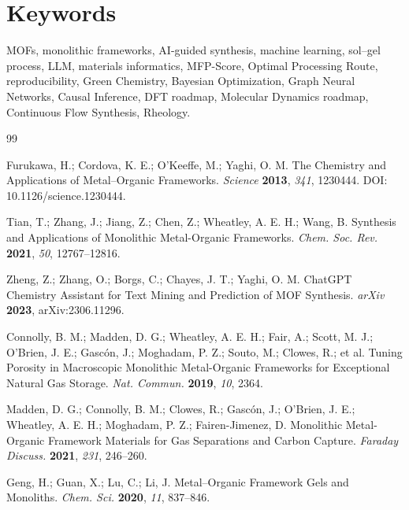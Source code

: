 \documentclass[12pt,a4paper]{article}
\begin{document}
\section*{Keywords}
\setlength{\parindent}{1em}
\setlength{\parskip}{0.5em}
MOFs, monolithic frameworks, AI-guided synthesis, machine learning, sol--gel process, LLM, materials informatics, MFP-Score, Optimal Processing Route, reproducibility, Green Chemistry, Bayesian Optimization, Graph Neural Networks, Causal Inference, DFT roadmap, Molecular Dynamics roadmap, Continuous Flow Synthesis, Rheology.



\begin{thebibliography}{99}

 Furukawa, H.; Cordova, K. E.; O'Keeffe, M.; Yaghi, O. M. The Chemistry and Applications of Metal--Organic Frameworks. \textit{Science} \textbf{2013}, \textit{341}, 1230444. DOI: 10.1126/science.1230444.

 Tian, T.; Zhang, J.; Jiang, Z.; Chen, Z.; Wheatley, A. E. H.; Wang, B. Synthesis and Applications of Monolithic Metal-Organic Frameworks. \textit{Chem. Soc. Rev.} \textbf{2021}, \textit{50}, 12767–12816.

 Zheng, Z.; Zhang, O.; Borgs, C.; Chayes, J. T.; Yaghi, O. M. ChatGPT Chemistry Assistant for Text Mining and Prediction of MOF Synthesis. \textit{arXiv} \textbf{2023}, arXiv:2306.11296.

 Connolly, B. M.; Madden, D. G.; Wheatley, A. E. H.; Fair, A.; Scott, M. J.; O’Brien, J. E.; Gascón, J.; Moghadam, P. Z.; Souto, M.; Clowes, R.; et al. Tuning Porosity in Macroscopic Monolithic Metal-Organic Frameworks for Exceptional Natural Gas Storage. \textit{Nat. Commun.} \textbf{2019}, \textit{10}, 2364.

 Madden, D. G.; Connolly, B. M.; Clowes, R.; Gascón, J.; O’Brien, J. E.; Wheatley, A. E. H.; Moghadam, P. Z.; Fairen-Jimenez, D. Monolithic Metal-Organic Framework Materials for Gas Separations and Carbon Capture. \textit{Faraday Discuss.} \textbf{2021}, \textit{231}, 246–260.

 Geng, H.; Guan, X.; Lu, C.; Li, J. Metal–Organic Framework Gels and Monoliths. \textit{Chem. Sci.} \textbf{2020}, \textit{11}, 837–846.


\end{thebibliography}
\end{document}
